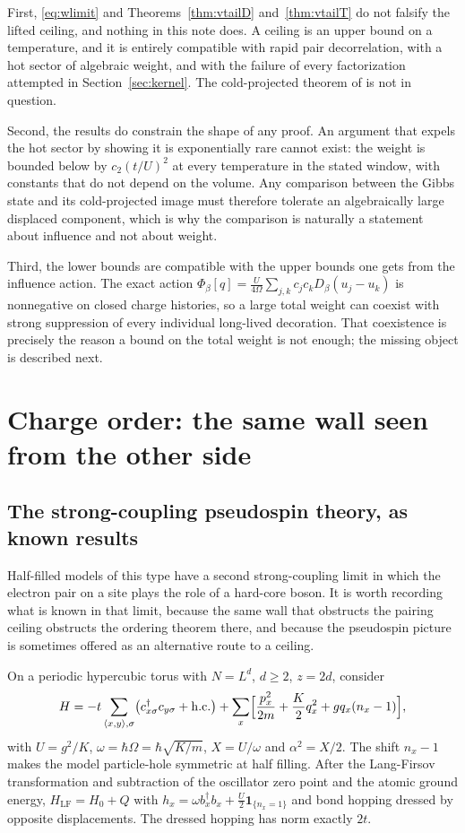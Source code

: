 \documentclass[11pt]{article}
\theoremstyle{definition}
\theoremstyle{remark}
\begin{document}
First, \eqref{eq:wlimit} and Theorems~\ref{thm:vtailD} and~\ref{thm:vtailT} do not
falsify the lifted ceiling, and nothing in this note does. A ceiling is an upper
bound on a temperature, and it is entirely compatible with rapid pair
decorrelation, with a hot sector of algebraic weight, and with the failure of
every factorization attempted in Section~\ref{sec:kernel}. The cold-projected
theorem of \cite{largeu} is not in question.

Second, the results do constrain the shape of any proof. An argument that expels
the hot sector by showing it is exponentially rare cannot exist: the weight is
bounded below by $c_{2}(t/U)^{2}$ at every temperature in the stated window, with
constants that do not depend on the volume. Any comparison between the Gibbs
state and its cold-projected image must therefore tolerate an algebraically large
displaced component, which is why the comparison is naturally a statement about
influence and not about weight.

Third, the lower bounds are compatible with the upper bounds one gets from the
influence action. The exact action
$\Phi_{\beta}[q]=\frac{U}{4\Omega}\sum_{j,k}c_{j}c_{k}D_{\beta}(u_{j}-u_{k})$ is
nonnegative on closed charge histories, so a large total weight can coexist with
strong suppression of every individual long-lived decoration. That coexistence is
precisely the reason a bound on the total weight is not enough; the missing object
is described next.

\section{Charge order: the same wall seen from the other side}
\label{sec:cdw}

\subsection{The strong-coupling pseudospin theory, as known results}

Half-filled models of this type have a second strong-coupling limit in which the
electron pair on a site plays the role of a hard-core boson. It is worth recording
what is known in that limit, because the same wall that obstructs the pairing
ceiling obstructs the ordering theorem there, and because the pseudospin picture
is sometimes offered as an alternative route to a ceiling.

On a periodic hypercubic torus with $N=L^{d}$, $d\ge2$, $z=2d$, consider
\begin{equation}
H=-t\sum_{\langle x,y\rangle,\sigma}\bigl(c^{\dagger}_{x\sigma}c_{y\sigma}
+\mathrm{h.c.}\bigr)+\sum_{x}\Bigl[\frac{p_{x}^{2}}{2m}+\frac K2q_{x}^{2}
+gq_{x}(n_{x}-1)\Bigr],
\label{eq:cdwH}
\end{equation}
with $U=g^{2}/K$, $\omega=\hbar\Omega=\hbar\sqrt{K/m}$, $X=U/\omega$ and
$\alpha^{2}=X/2$. The shift $n_{x}-1$ makes the model particle-hole symmetric at
half filling. After the Lang-Firsov transformation and subtraction of the
oscillator zero point and the atomic ground energy,
$H_{\mathrm{LF}}=H_{0}+Q$ with $h_{x}=\omega b_{x}^{\dagger}b_{x}
+\frac U2\mathbf{1}_{\{n_{x}=1\}}$ and bond hopping dressed by opposite
displacements. The dressed hopping has norm exactly $2t$.
\end{document}
